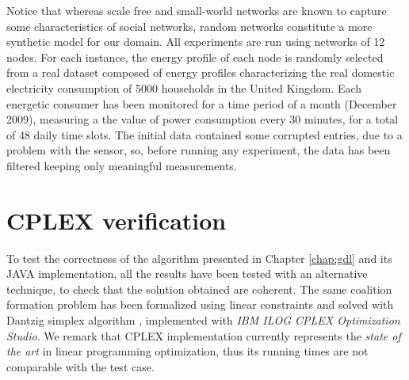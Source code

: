\documentclass[11pt, twoside, titlepage, a4paper, openright]{report}
\begin{document}
\vspace{0.1in}\noindent Notice that whereas scale free
and small-world networks  are known to capture some characteristics of social
networks, random networks constitute a more synthetic model for our domain.
All experiments are run using networks of 12 nodes. For each instance, the
energy profile of each node is randomly selected from a  real dataset composed
of energy profiles characterizing the real domestic electricity consumption
of 5000 households in the United Kingdom. Each energetic consumer has been monitored for a time period of a month (December 2009), measuring a the value of power consumption every 30 minutes, for a total of 48 daily time slots. The initial data contained some corrupted entries, due to a problem with the sensor, so, before running any experiment, the data has been filtered keeping only meaningful measurements.

\section{CPLEX verification}

To test the correctness of the algorithm presented in Chapter \ref{chap:gdl} and its JAVA implementation, all the results have been tested with an alternative technique, to check that the solution obtained are coherent. The same coalition formation problem has been formalized using linear constraints and solved with Dantzig simplex algorithm \cite{615762}, implemented with \textit{IBM ILOG CPLEX Optimization Studio}. We remark that CPLEX implementation currently represents the \textit{state of the art} in linear programming optimization, thus its running times are not comparable with the test case.


\end{document}
